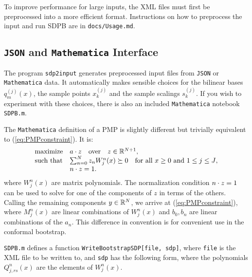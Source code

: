 \documentclass[12pt]{article}
\numberwithin{equation}{section}
\renewcommand{\be}{\begin{eqnarray}}
\renewcommand{\ee}{\end{eqnarray}}
\begin{document}
To improve performance for large inputs, the XML files must first be
preprocessed into a more efficient format.  Instructions on how to
preprocess the input and run SDPB are in \texttt{docs/Usage.md}.

\subsection{\texttt{JSON} and \texttt{Mathematica} Interface}

The program \texttt{sdp2input} generates preprocessed input files from
\texttt{JSON} or \texttt{Mathematica} data.
It automatically makes sensible choices for the bilinear bases
$q_m^{(j)}(x)$, the sample points $x_k^{(j)}$ and the sample scalings
$s_k^{(j)}$.  If you wish to experiment with these choices, there is
also an included \texttt{Mathematica} notebook \texttt{SDPB.m}.

The \texttt{Mathematica} definition of a PMP is slightly different but trivially equivalent to (\ref{eq:PMPconstraint}).  It is:
\be
\label{eq:PMPconstraintMathematica}
\begin{array}{ll}
\textrm{maximize} & a\.z\quad\textrm{over}\quad z \in \R^{N+1},\\
\textrm{such that} & \sum_{n=0}^{N} z_n W^n_j(x) \succeq 0 \quad \textrm{for all $x\geq 0$ and $1 \leq j \leq J$},\\
 & n\.z = 1.
\end{array}
\ee
where $W_j^n(x)$ are matrix polynomials.  The normalization condition $n\.z=1$ can be used to solve for one of the components of $z$ in terms of the others.  Calling the remaining components $y\in \R^N$, we arrive at (\ref{eq:PMPconstraint}), where $M_j^n(x)$ are linear combinations of $W^n_j(x)$ and $b_0,b_n$ are linear combinations of the $a_n$.  This difference in convention is for convenient use in the conformal bootstrap.

\texttt{SDPB.m} defines a function \texttt{WriteBootstrapSDP[file, sdp]}, where \texttt{file} is the XML file to be written to, and \texttt{sdp} has the following form, where the polynomials $Q^n_{j,rs}(x)$ are the elements of $W_j^n(x)$.
\end{document}
